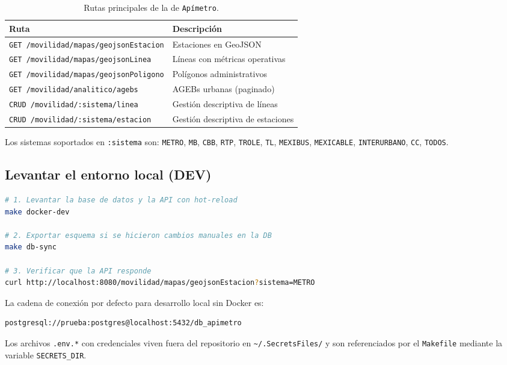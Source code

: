 \begin{table}[H]
    \centering
    \small
    \begin{tabular}{|l|l|}
        \hline
        \textbf{Ruta} & \textbf{Descripción} \\ \hline
        \texttt{GET /movilidad/mapas/geojsonEstacion}  & Estaciones en GeoJSON \\ \hline
        \texttt{GET /movilidad/mapas/geojsonLinea}     & Líneas con métricas operativas \\ \hline
        \texttt{GET /movilidad/mapas/geojsonPoligono}  & Polígonos administrativos \\ \hline
        \texttt{GET /movilidad/analitico/agebs}        & AGEBs urbanas (paginado) \\ \hline
        \texttt{CRUD /movilidad/:sistema/linea}        & Gestión descriptiva de líneas \\ \hline
        \texttt{CRUD /movilidad/:sistema/estacion}     & Gestión descriptiva de estaciones \\ \hline
    \end{tabular}
    \caption{Rutas principales de la \api{} de \texttt{Apímetro}.}
    \label{tab:rutas-apimetro}
\end{table}

Los sistemas soportados en \texttt{:sistema} son: \texttt{METRO}, \texttt{MB},
\texttt{CBB}, \texttt{RTP}, \texttt{TROLE}, \texttt{TL}, \texttt{MEXIBUS},
\texttt{MEXICABLE}, \texttt{INTERURBANO}, \texttt{CC}, \texttt{TODOS}.

\subsection*{Levantar el entorno local (DEV)}

\begin{lstlisting}[language=bash,
    caption={Secuencia mínima para levantar \texttt{Apimetro} en
             desarrollo local.},
    label=lst:dev-setup]
# 1. Levantar la base de datos y la API con hot-reload
make docker-dev

# 2. Exportar esquema si se hicieron cambios manuales en la DB
make db-sync

# 3. Verificar que la API responde
curl http://localhost:8080/movilidad/mapas/geojsonEstacion?sistema=METRO
\end{lstlisting}

La cadena de conexión por defecto para desarrollo local sin Docker es:

\begin{lstlisting}[language=bash, label=lst:dsn]
postgresql://prueba:postgres@localhost:5432/db_apimetro
\end{lstlisting}

Los archivos \texttt{.env.*} con credenciales viven fuera del repositorio en
\texttt{\textasciitilde/.SecretsFiles/} y son referenciados por el
\texttt{Makefile} mediante la variable \texttt{SECRETS\_DIR}.

